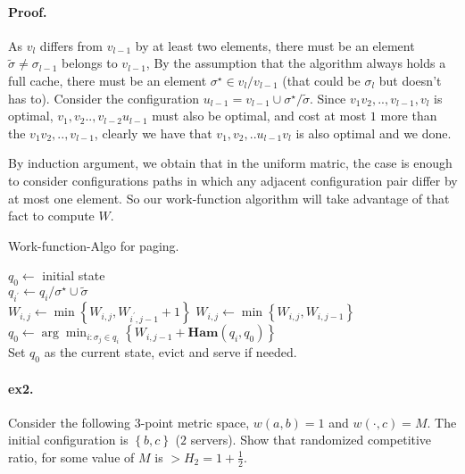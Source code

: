 \documentclass{article}
\begin{document}
\begin{multicols*}{2}
  \paragraph{Proof.} As $v_{l}$ differs from $v_{l-1}$ by at least two elements, there must be an element $\tilde{\sigma} \neq \sigma_{l-1}$ belongs to $v_{l-1}$, By the assumption that the algorithm always holds a full cache, there must be an element $\sigma^{\star} \in v_{l} / v_{l-1}$ (that could be $\sigma_{l}$ but doesn't has to). Consider the configuration $u_{l-1} = v_{l-1} \cup \sigma^{\star} / \tilde{\sigma}$. Since $v_{1}v_{2},..,v_{l-1},v_{l}$ is optimal, $v_{1},v_{2}..,v_{l-2}u_{l-1}$ must also be optimal, and cost at most $1$ more than the  $v_{1}v_{2},..,v_{l-1} $, clearly we have that $v_{1},v_{2},..u_{l-1}v_{l}$ is also optimal and we done. 

  By induction argument, we obtain that in the uniform matric, the case is enough to consider configurations paths in which any adjacent configuration pair differ by at most one element. So our work-function algorithm will take advantage of that fact to compute $W$.

  \begin{algorithm}[H]
    \caption{Work-function-Algo for paging.}
    \label{alg:three}
    $q_{0} \leftarrow $ initial state \\ 
     {
       {
	 {
	   {
	    $q_{i^{\prime} } \leftarrow  q_{i} / \sigma^{\star} \cup \tilde{\sigma}$ \\ 
	    $W_{i,j} \leftarrow \min \left\{   W_{i,j} ,  W_{i^{\prime},j-1} + 1 \right\} $
	  }
	  $W_{i,j} \leftarrow \min \left\{   W_{i,j} ,  W_{i,j-1}  \right\} $ \\
	}
      }
      $q_{0} \leftarrow \arg \min_{i : \sigma_{j} \in q_{i}} \left\{ W_{i,j-1} +  \mathbf{Ham}\left( q_{i}, q_{0} \right)  \right\} $ \\
      Set $q_{0}$ as the current state, evict and serve if needed. 
    }
  \end{algorithm}
  \paragraph{ex2.} Consider the following $3$-point metric space, $w\left( a,b \right) = 1 $ and $w\left( \cdot, c  \right) = M $. The initial configuration is $ \left\{ b,c \right\}$ ($2$ servers). Show that randomized competitive ratio, for some value of $M$ is $ > H_{2} = 1 + \frac{1}{2}$. 

\end{multicols*}
\end{document}
